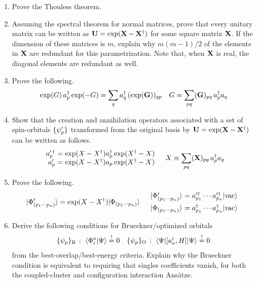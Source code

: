 \documentclass[11pt]{article}
\begin{document}
\begin{enumerate}
\item
Prove the Thouless theorem.

\item
Assuming the spectral theorem for normal matrices, prove that every unitary matrix can be written as
$
  \mathbf{U}
=
  \mathrm{exp}(\mathbf{X} - \mathbf{X}^\dagger)
$
for some square matrix $\mathbf{X}$.
If the dimension of these matrices is $m$, explain why $m(m-1)/2$ of the elements in $\mathbf{X}$ are redundant for this parametrization.
Note that, when $\mathbf{X}$ is real, the diagonal elements are redundant as well.

\item
Prove the following.
\begin{align}
  \mathrm{exp}(G)\,a_p^\dagger\,\mathrm{exp}(-G)
=
  \sum_q
  a_q^\dagger\,
  (\mathrm{exp}(\mathbf{G}))_{qp}
&&
  G
=
  \sum_{pq}
  (\mathbf{G})_{pq}\,
  a_p^\dagger a_q
\end{align}



\item
Show that the creation and annihilation operators associated with a set of spin-orbitals $\{\psi _p'\}$ transformed from the original basis by $\mathbf{U}=\mathrm{exp}(\mathbf{X} - \mathbf{X}^\dagger)$ can be written as follows.
\begin{align}
\begin{array}{r@{\ }l}
  a_p^{\prime\,\dagger}
&=
  \mr{exp}(X - X\dg)
  a_p\dg\,
  \mr{exp}(X\dg - X)
\\
  a_p^{\prime}
&=
  \mr{exp}(X - X\dg)
  a_p\,
  \mr{exp}(X\dg - X)
\end{array}
&&
  X
\equiv
  \sum_{pq}
  (\bo{X})_{pq}\,
  a_p\dg a_q
\end{align}


\item
Prove the following.
\begin{align}
  \kt{\F'_{(p_1\cd p_n)}}
=
  \mr{exp}(X - X\dg)
  \kt{\F_{(p_1\cd p_n)}}
&&
\begin{array}{r@{\ }l}
  \kt{\F'_{(p_1\cd p_n)}}
&=
  a_{p_1}^{\prime \dagger}
\cd
  a_{p_n}^{\prime \dagger}
  \kt{\vac}
\\[5pt]
  \kt{\F_{(p_1\cd p_n)}}
&=
  a_{p_1}^{ \dagger}
\cd
  a_{p_n}^{ \dagger}
  \kt{\vac}
\end{array}
\end{align}

\item
Derive the following conditions for Brueckner/optimized orbitals
\begin{align}
\label{eq:brueckner-and-oo-explicit-condition}
  \{\psi _p\}_{\mathrm{B}}\,:\,\,
  \langle\Phi _i^a|\Psi \rangle
\overset{!}{=}
  0
&&
  \{\psi _p\}_{\mathrm{O}}\,:\,\,
  \langle\Psi |[a_a^i, H]|\Psi \rangle
\overset{!}{=}
  0
\end{align}
from the best-overlap/best-energy criteria.  Explain why the Brueckner condition is equivalent to requiring that singles coefficients vanish, for both the coupled-cluster and configuration interaction Ans\"atze.



\end{enumerate}
\end{document}
